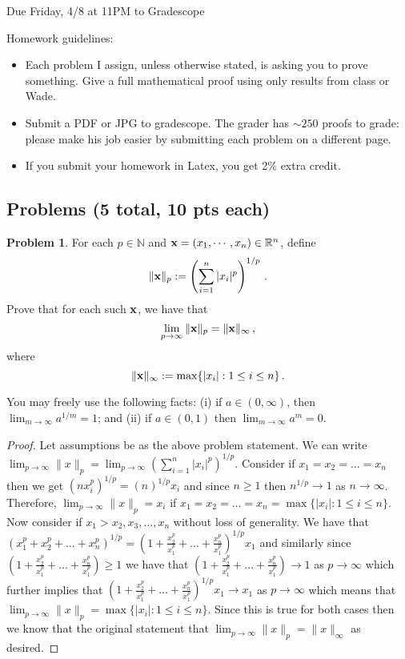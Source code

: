 \documentclass[11pt]{article}
\theoremstyle{definition}
\newtheorem{problem}{Problem}
\newcommand{\N}{\mathbb{N}}
\newcommand{\R}{\mathbb{R}}
\newcommand{\bx}{{\bf x}}
\begin{document}
  \hfill Due Friday, 4/8 at 11PM to Gradescope

\bigskip

\noindent Homework guidelines: 
\begin{itemize}
\item Each problem I assign, unless otherwise stated, is asking you to prove something. Give a full mathematical proof using only results from class or Wade.
\item Submit a PDF or JPG to gradescope. The grader has $\sim 250$ proofs to grade:  please make his job easier by submitting each problem on a different page. 
\item If you submit your homework in Latex, you get 2\% extra credit. 
\end{itemize}


\subsection*{Problems (5 total, 10 pts each)}

\begin{problem}
For each $p \in \N$ and $\bx = (x_1, \cdots, x_n) \in \R^n$, define
\[
\| \bx\|_p := \left( \sum_{i = 1}^n | x_i|^p\right)^{1/p} \,. 
\]
Prove that for each such $\bx$, we have that
\[
\lim_{p \to \infty} \| \bx\|_p = \| \bx\|_\infty \, , 
\]
where 
\[
\| \bx \|_\infty := \max\{ |x_i| : 1 \leq i \leq n \} \, .
\]

You may freely use the following facts: (i) if $a \in (0,\infty)$, then $\lim_{m \to \infty} {a}^{1/m} = 1$; and (ii) if $a \in (0,1)$ then $\lim_{m \to \infty} a^m = 0$. 
\end{problem}

\begin{proof}
Let assumptions be as the above problem statement. We can write $\lim_{p\to \infty}\|x\|_p = \lim_{p \to \infty}(\sum_{i=1}^n|x_i|^p)^{1/p}.$ Consider if $x_1 = x_2 = ... = x_n$ then we get $(nx_i^p)^{1/p} = (n)^{1/p}x_i$ and since $n \geq 1$ then $n^{1/p} \to 1$ as $n \to \infty$. Therefore, $\lim_{p\to \infty}\|x\|_p = x_i$ if $x_1 = x_2 = ... = x_n = \max\{|x_i|: 1 \leq i \leq n\}$. Now consider if $x_1 > x_2, x_3 , ..., x_n$ without loss of generality. We have that $(x_1^p + x_2^p + ... + x_n^p) ^{1 / p} = (1 + \frac{x_2^p}{x_1^p} + ... + \frac{x_n^p}{x_1^p})^{1/p}x_1$ and similarly since $(1 + \frac{x_2^p}{x_1^p} + ... + \frac{x_n^p}{x_1^p}) \geq 1$ we have that $(1 + \frac{x_2^p}{x_1^p} + ... + \frac{x_n^p}{x_1^p}) \to 1$ as $p \to \infty$ which further implies that $(1 + \frac{x_2^p}{x_1^p} + ... + \frac{x_n^p}{x_1^p})^{1/p}x_1 \to x_1$  as $p \to \infty$ which means that $\lim_{p\to \infty}\|x\|_p = \max\{|x_i|: 1 \leq i \leq n\}.$ Since this is true for both cases then we know that the original statement that $\lim_{p \to \infty}\|x\|_p = \|x\|_\infty$ as desired. 
\end{proof}
\end{document}

